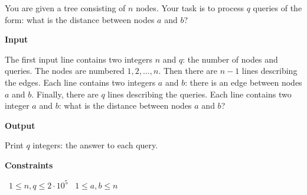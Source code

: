 You are given a tree consisting of $n$ nodes.
Your task is to process $q$ queries of the form: what is the distance between nodes $a$ and $b$?

\vspace{0.3cm}\noindent\textbf{Input}

The first input line contains two integers $n$ and $q$: the number of nodes and queries. The nodes are numbered $1,2,\ldots,n$.
Then there are $n-1$ lines describing the edges. Each line contains two integers $a$ and $b$: there is an edge between nodes $a$ and $b$.
Finally, there are $q$ lines describing the queries. Each line contains two integer $a$ and $b$: what is the distance between nodes $a$ and $b$?

\vspace{0.3cm}\noindent\textbf{Output}

Print $q$ integers: the answer to each query.

\vspace{0.3cm}\noindent\textbf{Constraints}

\textbullet\ $1 \le n, q \le 2 \cdot 10^5$
\textbullet\ $1 \le a,b \le n$
